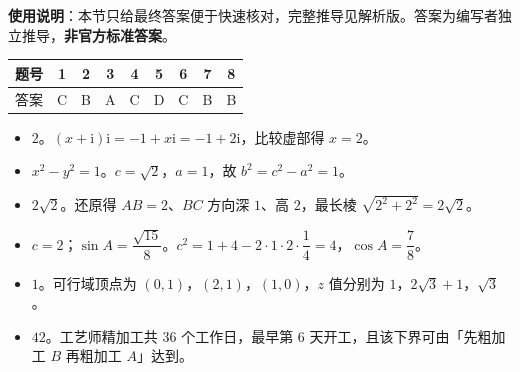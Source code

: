 
\begin{gknotice}
\textbf{使用说明}：本节只给最终答案便于快速核对，完整推导见解析版。答案为编写者独立推导，\textbf{非官方标准答案}。
\end{gknotice}

\begin{center}\begin{tabular}{ccccccccc}
\toprule
题号 & 1 & 2 & 3 & 4 & 5 & 6 & 7 & 8 \\
\midrule
答案 & C & B & A & C & D & C & B & B \\
\bottomrule
\end{tabular}\end{center}

\begin{itemize}[leftmargin=2.6em]
  \item[\textbf{9.}] $2$。$(x+\mathrm i)\mathrm i=-1+x\mathrm i=-1+2\mathrm i$，比较虚部得 $x=2$。
  \item[\textbf{10.}] $x^2-y^2=1$。$c=\sqrt2$，$a=1$，故 $b^2=c^2-a^2=1$。
  \item[\textbf{11.}] $2\sqrt2$。还原得 $AB=2$、$BC$ 方向深 $1$、高 $2$，最长棱 $\sqrt{2^2+2^2}=2\sqrt2$。
  \item[\textbf{12.}] $c=2$；$\sin A=\dfrac{\sqrt{15}}8$。$c^2=1+4-2\cdot1\cdot2\cdot\dfrac14=4$，$\cos A=\dfrac78$。
  \item[\textbf{13.}] $1$。可行域顶点为 $(0,1)$，$(2,1)$，$(1,0)$，$z$ 值分别为 $1$，$2\sqrt3+1$，$\sqrt3$。
  \item[\textbf{14.}] $42$。工艺师精加工共 $36$ 个工作日，最早第 $6$ 天开工，且该下界可由「先粗加工 $B$ 再粗加工 $A$」达到。
\end{itemize}

